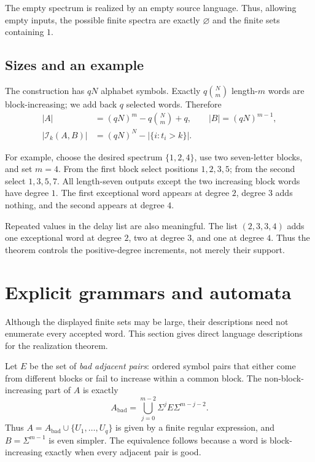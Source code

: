 \documentclass[11pt,letterpaper]{article}
\theoremstyle{definition}\newtheorem{definition}[theorem]{Definition}
\theoremstyle{remark}\newtheorem{remark}[theorem]{Remark}
\theoremstyle{definition}\newtheorem{question}[theorem]{Question}
\newcommand{\ins}[3]{\mathcal I_{#1}(#2,#3)}
\begin{document}
The empty spectrum is realized by an empty source language. Thus, allowing empty inputs, the possible finite spectra are exactly $\varnothing$ and the finite sets containing $1$.

\subsection{Sizes and an example}

The construction has $qN$ alphabet symbols. Exactly $q\binom Nm$ length-$m$ words are block-increasing; we add back $q$ selected words. Therefore
\begin{align*}
 |A|&=(qN)^m-q\binom Nm+q,\qquad |B|=(qN)^{m-1},\\
 |\ins{k}{A}{B}|&=(qN)^N-|\{i:t_i>k\}|.
\end{align*}

For example, choose the desired spectrum $\{1,2,4\}$, use two seven-letter blocks, and set $m=4$. From the first block select positions $1,2,3,5$; from the second select $1,3,5,7$. All length-seven outputs except the two increasing block words have degree $1$. The first exceptional word appears at degree $2$, degree $3$ adds nothing, and the second appears at degree $4$.

Repeated values in the delay list are also meaningful. The list $(2,3,3,4)$ adds one exceptional word at degree $2$, two at degree $3$, and one at degree $4$. Thus the theorem controls the positive-degree increments, not merely their support.

\section{Explicit grammars and automata}

Although the displayed finite sets may be large, their descriptions need not enumerate every accepted word. This section gives direct language descriptions for the realization theorem.

Let $E$ be the set of \emph{bad adjacent pairs}: ordered symbol pairs that either come from different blocks or fail to increase within a common block. The non-block-increasing part of $A$ is exactly
\begin{equation}
 A_{\mathrm{bad}}=
 \bigcup_{j=0}^{m-2}\Sigma^j E\Sigma^{m-j-2}.
 \label{eq:regex}
\end{equation}
Thus $A=A_{\mathrm{bad}}\cup\{U_1,\ldots,U_q\}$ is given by a finite regular expression, and $B=\Sigma^{m-1}$ is even simpler. The equivalence follows because a word is block-increasing exactly when every adjacent pair is good.
\end{document}
